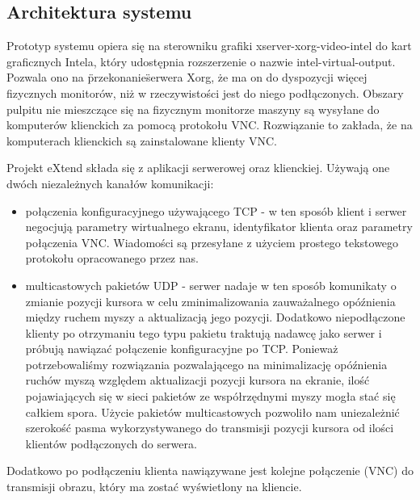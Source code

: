     \vfill

  \subsection{Architektura systemu}

    Prototyp systemu opiera się na sterowniku grafiki xserver-xorg-video-intel do kart graficznych Intela, który udostępnia rozszerzenie o nazwie intel-virtual-output. Pozwala ono na \"przekonanie\" serwera Xorg, że ma on do dyspozycji więcej fizycznych monitorów, niż w rzeczywistości jest do niego podłączonych. Obszary pulpitu nie mieszczące się na fizycznym monitorze maszyny są wysyłane do komputerów klienckich za pomocą protokołu VNC. Rozwiązanie to zakłada, że na komputerach klienckich są zainstalowane klienty VNC.


    Projekt eXtend składa się z aplikacji serwerowej oraz klienckiej. Używają one dwóch niezależnych kanałów komunikacji:
    \begin{itemize}
      \item połączenia konfiguracyjnego używającego TCP - w ten sposób klient i serwer negocjują parametry wirtualnego ekranu, identyfikator klienta oraz parametry połączenia VNC. Wiadomości są przesyłane z użyciem prostego tekstowego protokołu opracowanego przez nas.
      \item multicastowych pakietów UDP - serwer nadaje w ten sposób komunikaty o zmianie pozycji kursora w celu zminimalizowania zauważalnego opóźnienia między ruchem myszy a aktualizacją jego pozycji. Dodatkowo niepodłączone klienty po otrzymaniu tego typu pakietu traktują nadawcę jako serwer i próbują nawiązać połączenie konfiguracyjne po TCP. Ponieważ potrzebowaliśmy rozwiązania pozwalającego na minimalizację opóźnienia ruchów myszą względem aktualizacji pozycji kursora na ekranie, ilość pojawiających się w sieci pakietów ze współrzędnymi myszy mogła stać się całkiem spora. Użycie pakietów multicastowych pozwoliło nam uniezależnić szerokość pasma wykorzystywanego do transmisji pozycji kursora od ilości klientów podłączonych do serwera.
    \end{itemize}

    Dodatkowo po podłączeniu klienta nawiązywane jest kolejne połączenie (VNC) do transmisji obrazu, który ma zostać wyświetlony na kliencie.


